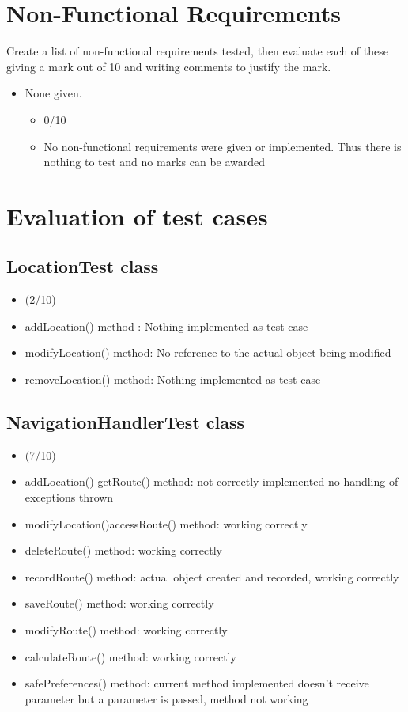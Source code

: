 \documentclass[12pt]{article}
\begin{document}
\section{Non-Functional Requirements}
\begin{flushleft}
Create a list of non-functional requirements tested, then evaluate each of these giving
a mark out of 10 and writing comments to justify the mark.
\end{flushleft}


    \begin{itemize}
        \item None given.
        \begin{itemize}
            \item 0/10
            \item No non-functional requirements were given or implemented. Thus there is nothing to test and no marks can be awarded
        \end{itemize}
    \end{itemize}
    
\section{Evaluation of test cases}
\subsection {LocationTest class}
\begin{itemize}
\item (2/10)
\item addLocation() method : Nothing implemented as test case 
\item modifyLocation() method: No reference to the actual object being modified
\item removeLocation() method: Nothing implemented as test case
\end{itemize} 

\subsection {NavigationHandlerTest class}
\begin{itemize}
\item (7/10)
\item addLocation() getRoute() method: not correctly implemented no handling of exceptions thrown
\item modifyLocation()accessRoute() method: working correctly
\item deleteRoute() method: working correctly
\item recordRoute() method: actual object created and recorded, working correctly
\item saveRoute() method: working correctly
\item modifyRoute() method: working correctly
\item calculateRoute() method: working correctly
\item safePreferences() method: current method implemented doesn’t receive parameter but a parameter is passed, method not working
\end{itemize}
\end{document}
